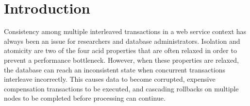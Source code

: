 \chapter{Introduction}\label{chap:intro}

Consistency among multiple interleaved transactions in a web service context has always been an issue for researchers and database administrators. Isolation and atomicity are two of the four \gls{acid} properties that are often relaxed in order to prevent a performance bottleneck. However, when these properties are relaxed, the database can reach an inconsistent state when concurrent transactions interleave incorrectly. This causes data to become corrupted, expensive compensation transactions to be executed, and cascading rollbacks on multiple nodes to be completed before processing can continue. 




